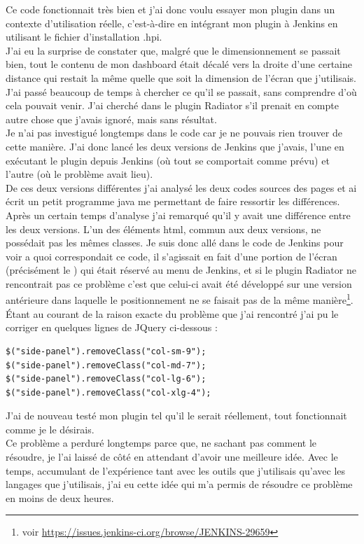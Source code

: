 Ce code fonctionnait très bien et j'ai donc voulu essayer mon plugin dans un contexte d'utilisation réelle, c'est-à-dire en intégrant mon plugin à Jenkins en utilisant le fichier d'installation .hpi.\\
J'ai eu la surprise de constater que, malgré que le dimensionnement se passait bien, tout le contenu de mon dashboard était décalé vers la droite d'une certaine distance qui restait la même quelle que soit la dimension de l'écran que j'utilisais.\\
J'ai passé beaucoup de temps à chercher ce qu'il se passait, sans comprendre d'où cela pouvait venir. J'ai cherché dans le plugin Radiator s'il prenait en compte autre chose que j'avais ignoré, mais sans résultat. \\
Je n'ai pas investigué longtemps dans le code car je ne pouvais rien trouver de cette manière. J'ai donc lancé les deux versions de Jenkins que j'avais, l'une en exécutant le plugin depuis Jenkins (où tout se comportait comme prévu) et l'autre (où le problème avait lieu).\\
De ces deux versions différentes j'ai analysé les deux codes sources des pages et ai écrit un petit programme java me permettant de faire ressortir les différences. Après un certain temps d'analyse j'ai remarqué qu'il y avait une différence entre les deux versions. L'un des éléments html, commun aux deux versions, ne possédait pas les mêmes classes. Je suis donc allé dans le code de Jenkins pour voir a quoi correspondait ce code, il s'agissait en fait d'une portion de l'écran (précisément le ) qui était réservé au menu de Jenkins, et si le plugin Radiator ne rencontrait pas ce problème c'est que celui-ci avait été développé sur une version antérieure dans laquelle le positionnement ne se faisait pas de la même manière\footnote{voir \url{https://issues.jenkins-ci.org/browse/JENKINS-29659}}.\\
\'{E}tant au courant de la raison exacte du problème que j'ai rencontré j'ai pu le corriger en quelques lignes de JQuery ci-dessous :\\
\begin{lstlisting}
$("side-panel").removeClass("col-sm-9");
$("side-panel").removeClass("col-md-7");
$("side-panel").removeClass("col-lg-6");
$("side-panel").removeClass("col-xlg-4");
\end{lstlisting}

J'ai de nouveau testé mon plugin tel qu'il le serait réellement, tout fonctionnait comme je le désirais.\\
Ce problème a perduré longtemps parce que, ne sachant pas comment le résoudre, je l'ai laissé de côté en attendant d'avoir une meilleure idée. Avec le temps, accumulant de l'expérience tant avec les outils que j'utilisais qu'avec les langages que j'utilisais, j'ai eu cette idée qui m'a permis de résoudre ce problème en moins de deux heures.\\

